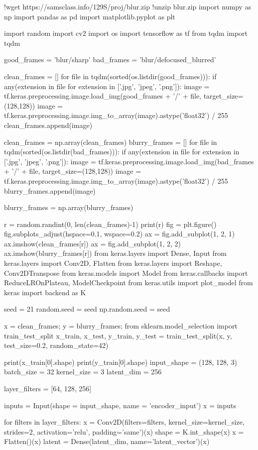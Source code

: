 !wget https://samsclass.info/129S/proj/blur.zip
!unzip blur.zip
import numpy as np
import pandas as pd
import matplotlib.pyplot as plt

import random
import cv2
import os
import tensorflow as tf
from tqdm import tqdm

good_frames = 'blur/sharp'
bad_frames = 'blur/defocused_blurred'

clean_frames = []
for file in tqdm(sorted(os.listdir(good_frames))):
    if any(extension in file for extension in ['.jpg', 'jpeg', '.png']):
        image = tf.keras.preprocessing.image.load_img(good_frames + '/' + file, target_size=(128,128))
        image = tf.keras.preprocessing.image.img_to_array(image).astype('float32') / 255
        clean_frames.append(image)

clean_frames = np.array(clean_frames)
blurry_frames = []
for file in tqdm(sorted(os.listdir(bad_frames))):
    if any(extension in file for extension in ['.jpg', 'jpeg', '.png']):
        image = tf.keras.preprocessing.image.load_img(bad_frames + '/' + file, target_size=(128,128))
        image = tf.keras.preprocessing.image.img_to_array(image).astype('float32') / 255
        blurry_frames.append(image)

blurry_frames = np.array(blurry_frames)

r = random.randint(0, len(clean_frames)-1)
print(r)
fig = plt.figure()
fig.subplots_adjust(hspace=0.1, wspace=0.2)
ax = fig.add_subplot(1, 2, 1)
ax.imshow(clean_frames[r])
ax = fig.add_subplot(1, 2, 2)
ax.imshow(blurry_frames[r])
from keras.layers import Dense, Input
from keras.layers import Conv2D, Flatten
from keras.layers import Reshape, Conv2DTranspose
from keras.models import Model
from keras.callbacks import ReduceLROnPlateau, ModelCheckpoint
from keras.utils import plot_model
from keras import backend as K

seed = 21
random.seed = seed
np.random.seed = seed

x = clean_frames;
y = blurry_frames;
from sklearn.model_selection import train_test_split
x_train, x_test, y_train, y_test = train_test_split(x, y, test_size=0.2, random_state=42)

print(x_train[0].shape)
print(y_train[0].shape)
input_shape = (128, 128, 3)
batch_size = 32
kernel_size = 3
latent_dim = 256

layer_filters = [64, 128, 256]

inputs = Input(shape = input_shape, name = 'encoder_input')
x = inputs

for filters in layer_filters:
    x = Conv2D(filters=filters,
               kernel_size=kernel_size,
               strides=2,
               activation='relu',
               padding='same')(x)
shape = K.int_shape(x)
x = Flatten()(x)
latent = Dense(latent_dim, name='latent_vector')(x)

